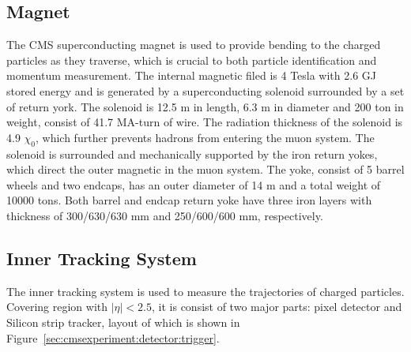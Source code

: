 



\subsection{Magnet}
The CMS superconducting magnet \cite{cms:magnetTdr:Acquistapace:1997fm} is used to provide bending to the charged particles as they traverse, which is crucial to both particle identification and momentum measurement. The internal magnetic filed is 4 Tesla with 2.6 GJ stored energy and is generated by a superconducting solenoid surrounded by a set of return york. The solenoid is 12.5 m in length, 6.3 m in diameter and 200 ton in weight, consist of 41.7 MA-turn of wire. The radiation thickness of the solenoid is 4.9 $\chi_0$, which further prevents hadrons from entering the muon system. The solenoid is surrounded and mechanically supported by the iron return yokes, which direct the outer magnetic in the muon system. The yoke, consist of 5 barrel wheels and two endcaps, has an outer diameter of 14 m and a total weight of 10000 tons. Both barrel and endcap return yoke have three iron layers with thickness of 300/630/630 mm and 250/600/600 mm, respectively.



\subsection{Inner Tracking System}
The inner tracking system \cite{cms:trackerTdr:CMS:1997tlf} is used to measure the trajectories of charged particles. Covering region with $|\eta|<2.5$, it is consist of two major parts: pixel detector and Silicon strip tracker, layout of which is shown in Figure~\ref{sec:cmsexperiment:detector:trigger}. 


